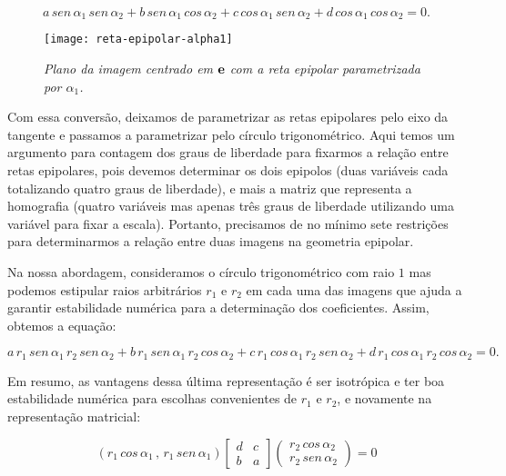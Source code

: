 \begin{equation*}
a\,sen\,\alpha_1\,sen\,\alpha_2+b\,sen\,\alpha_1\,cos\,\alpha_2+c\,cos\,\alpha_1\,sen\,\alpha_2+d\,cos\,\alpha_1\,cos\,\alpha_2=0.
\end{equation*}

\begin{figure}[!htb]
\centering
\texttt{[image: reta-epipolar-alpha1]}
\caption{\textit{Plano da imagem centrado em ${\bf e}$ com a reta epipolar parametrizada por $\alpha_1$.}}
\label{fig.reta-epipolar}
\end{figure}

Com essa conversão, deixamos de parametrizar as retas epipolares pelo eixo da tangente e passamos a parametrizar pelo círculo trigonométrico. Aqui temos um argumento para contagem dos graus de liberdade para fixarmos a relação entre retas epipolares, pois devemos determinar os dois epipolos (duas variáveis cada totalizando quatro graus de liberdade), e mais a matriz que representa a homografia (quatro variáveis mas apenas três graus de liberdade utilizando uma variável para fixar a escala). Portanto, precisamos de no mínimo sete restrições para determinarmos a relação entre duas imagens na geometria epipolar. 

Na nossa abordagem, consideramos o círculo trigonométrico com raio $1$ mas podemos estipular raios arbitrários $r_1$ e $r_2$ em cada uma das imagens que ajuda a garantir estabilidade numérica para a determinação dos coeficientes. Assim, obtemos a equação:

\begin{equation*}
a\,r_1\,sen\,\alpha_1\,r_2\,sen\,\alpha_2+b\,r_1\,sen\,\alpha_1\,r_2\,cos\,\alpha_2+c\,r_1\,cos\,\alpha_1\,r_2\,sen\,\alpha_2+d\,r_1\,cos\,\alpha_1\,r_2\,cos\,\alpha_2=0.
\end{equation*}

Em resumo, as vantagens dessa última representação é ser isotrópica e ter boa estabilidade numérica para escolhas convenientes de $r_1$ e $r_2$, e novamente  na representação matricial:

\begin{equation*}
(r_1\,cos\,\alpha_1\,,\,r_1\,sen\,\alpha_1)
\begin{bmatrix}
d&c\\
b&a
\end{bmatrix}
\begin{pmatrix}
r_2\,cos\,\alpha_2\\
r_2\,sen\,\alpha_2
\end{pmatrix}
=0
\end{equation*}

